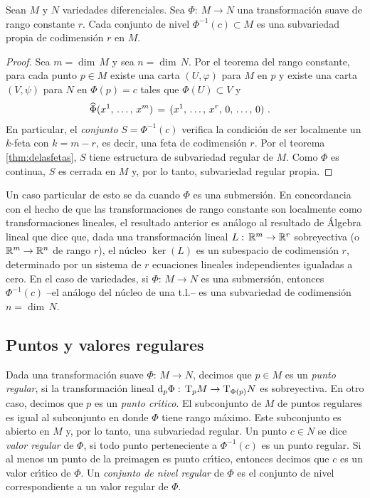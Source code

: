 \begin{teoDeLosConjuntosDeNivel}
	\label{thm:denivel}
	Sean $M$ y $N$ variedades diferenciales. Sea $\Phi:\,M\rightarrow N$
	una transformaci\'{o}n suave de rango constante $r$. Cada conjunto
	de nivel $\Phi^{-1}(c)\subset M$ es una subvariedad propia de
	codimensi\'{o}n $r$ en $M$.
\end{teoDeLosConjuntosDeNivel}

\begin{proof}
	Sea $m=\dim\,M$ y sea $n=\dim\,N$. Por el teorema del rango constante,
	para cada punto $p\in M$ existe una carta $(U,\varphi)$ para $M$
	en $p$ y existe una carta $(V,\psi)$ para $N$ en $\Phi(p)=c$ tales
	que $\Phi(U)\subset V$ y
	\begin{align*}
		\widehat{\Phi}(\lista*{x}{m}) & \,=\,
			(\lista*{x}{r},\,0,\,\dots,\,0)
		\text{ .}
	\end{align*}
	En particular, el \emph{conjunto} $S=\Phi^{-1}(c)$ verifica la
	condici\'{o}n de ser localmente un $k$-feta con $k=m-r$, es
	decir, una feta de codimensi\'{o}n $r$. Por el teorema
	\ref{thm:delasfetas}, $S$ tiene estructura de subvariedad regular
	de $M$. Como $\Phi$ es continua, $S$ es cerrada en $M$ y, por lo
	tanto, subvariedad regular propia.
\end{proof}

Un caso particular de esto se da cuando $\Phi$ es una submersi\'{o}n.
En concordancia con el hecho de que las transformaciones de rango constante
son localmente como transformaciones lineales, el resultado anterior es
an\'{a}logo al resultado de \'{A}lgebra lineal que dice que, dada una
transformaci\'{o}n lineal $L:\,\mathbb{R}^{m}\rightarrow\mathbb{R}^{r}$ sobreyectiva
(o $\mathbb{R}^{m}\rightarrow\mathbb{R}^{n}$ de rango $r$), el n\'{u}cleo $\ker(L)$
es un subespacio de codimensi\'{o}n $r$, determinado por un sistema de $r$
ecuaciones lineales independientes igualadas a cero. En el caso de
variedades, si $\Phi:\,M\rightarrow N$ es una submersi\'{o}n, entonces
$\Phi^{-1}(c)$ --el an\'{a}logo del n\'{u}cleo de una t.l.-- es una
subvariedad de codimensi\'{o}n $n=\dim\,N$.

\subsection{Puntos y valores regulares}
Dada una transformaci\'{o}n suave $\Phi:\,M\rightarrow N$, decimos que
$p\in M$ es un \emph{punto regular}, si la transformaci\'{o}n lineal
$\diferencial[p]{\Phi}:\,\tangente[p]{M}\rightarrow\tangente[\Phi(p)]{N}$
es sobreyectiva. En otro caso, decimos que $p$ es un \emph{punto cr\'{\i}tico}.
El subconjunto de $M$ de puntos regulares es igual al subconjunto en donde
$\Phi$ tiene rango m\'{a}ximo. Este subconjunto es abierto en $M$ y, por lo
tanto, una subvariedad regular. Un punto $c\in N$ se dice \emph{valor %
regular} de $\Phi$, si todo punto perteneciente a $\Phi^{-1}(c)$ es un punto
regular. Si al menos un punto de la preimagen es punto cr\'{\i}tico, entonces
decimos que $c$ es un valor cr\'{\i}tico de $\Phi$. Un \emph{conjunto de %
nivel regular} de $\Phi$ es el conjunto de nivel correspondiente a un valor
regular de $\Phi$.

